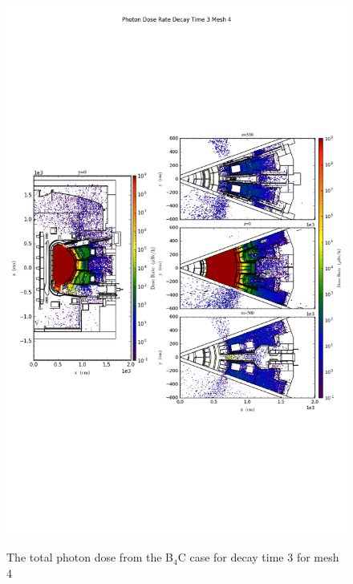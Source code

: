 \begin{figure}[ht!]
\centering
\includegraphics[trim={0cm 9cm 0cm 10cm},clip,scale=0.75]{../plots/final_model_nob4c/Photon_Dose_Rate_Decay_Time_3_Mesh_4.png}
\label{fig:photons_dc3_no4bc_m4_flux}
\caption{The total photon dose from the B$_4$C case for decay time 3 for mesh 4}
\end{figure}
